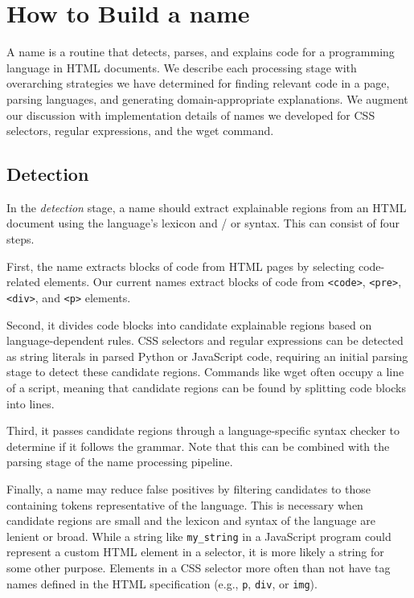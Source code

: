 \section{How to Build a \Gls{name}}

A \Gls{name} is a routine that detects, parses, and explains code for a programming language in HTML documents.
We describe each processing stage with overarching strategies we have determined for finding relevant code in a page, parsing languages, and generating domain-appropriate explanations.
We augment our discussion with implementation details of \Glspl{name} we developed for CSS selectors, regular expressions, and the wget command.

\subsection{Detection}
In the \emph{detection} stage, a \Gls{name} should extract explainable regions from an HTML document using the language's lexicon and / or syntax.
This can consist of four steps.

First, the \Gls{name} extracts blocks of code from HTML pages by selecting code-related elements.
Our current \Glspl{name} extract blocks of code from \texttt{<code>}, \texttt{<pre>}, \texttt{<div>}, and \texttt{<p>} elements.

Second, it divides code blocks into candidate explainable regions based on language-dependent rules.
CSS selectors and regular expressions can be detected as string literals in parsed Python or JavaScript code, requiring an initial parsing stage to detect these candidate regions.
Commands like wget often occupy a line of a script, meaning that candidate regions can be found by splitting code blocks into lines.

Third, it passes candidate regions through a language-specific syntax checker to determine if it follows the grammar.
Note that this can be combined with the parsing stage of the \Gls{name} processing pipeline.

Finally, a \Gls{name} may reduce false positives by filtering candidates to those containing tokens representative of the language.
This is necessary when candidate regions are small and the lexicon and syntax of the language are lenient or broad.
While a string like \texttt{\qs{}my\_string\qs{}} in a JavaScript program could represent a custom HTML element in a selector, it is more likely a string for some other purpose.
Elements in a CSS selector more often than not have tag names defined in the HTML specification (e.g., \texttt{p}, \texttt{div}, or \texttt{img}).

